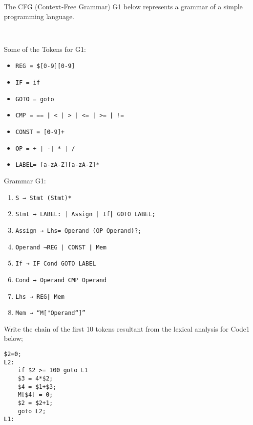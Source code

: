 \documentclass[docid=2020]{comp_test1}
\begin{document}
\renewcommand\thesubsubsection{\thesubsection.\arabic{subsubsection}}
\setcounter{chapter}{2020}


The CFG (Context-Free Grammar) G1 below represents a grammar of a simple programming language.

~

\begin{minipage}[t]{0.44\textwidth}
    Some of the Tokens for G1:
    
    \begin{itemize}[wide, noitemsep, label={}]
        \item \texttt{REG = \$[0-9][0-9]}
        \item \texttt{IF = if}
        \item \texttt{GOTO = goto}
        \item \texttt{CMP = == | < | > | <= | >= | !=}
        \item \texttt{CONST = [0-9]+}
        \item \texttt{OP = + | -| * | /}
        \item \texttt{LABEL= [a-zA-Z][a-zA-Z]*}
    \end{itemize}
\end{minipage}
\begin{minipage}[t]{0.54\textwidth}
    Grammar G1:
    
    \begin{enumerate}
        \item \texttt{S → Stmt (Stmt)*}
        \item \texttt{Stmt → LABEL: | Assign | If| GOTO LABEL;}
        \item \texttt{Assign → Lhs= Operand (OP Operand)?;}
        \item \texttt{Operand →REG | CONST | Mem}
        \item \texttt{If → IF Cond GOTO LABEL}
        \item \texttt{Cond → Operand CMP Operand }
        \item \texttt{Lhs → REG| Mem}
        \item \texttt{Mem → “M["Operand“]”}
    \end{enumerate}
\end{minipage}

\question
Write the chain of the first 10 tokens resultant from the lexical analysis for Code1 below;

\begin{lstlisting}[caption=Code1]
    $2=0;
L2:
    if $2 >= 100 goto L1
    $3 = 4*$2;
    $4 = $1+$3;
    M[$4] = 0;
    $2 = $2+1;
    goto L2;
L1:
\end{lstlisting}
\end{document}
